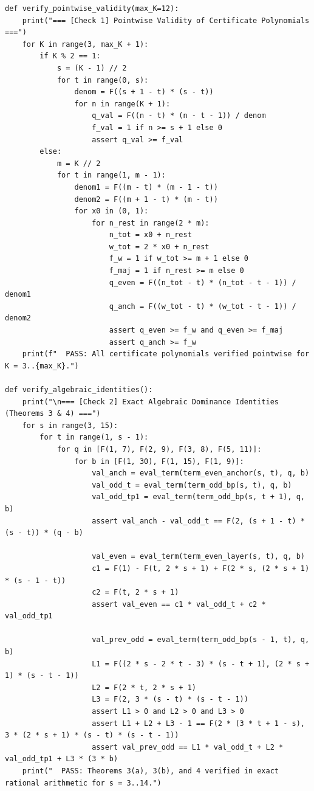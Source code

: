 \documentclass[11pt,a4paper]{article}
\theoremstyle{definition}
\theoremstyle{remark}
\begin{document}
\begin{lstlisting}
def verify_pointwise_validity(max_K=12):
    print("=== [Check 1] Pointwise Validity of Certificate Polynomials ===")
    for K in range(3, max_K + 1):
        if K % 2 == 1:
            s = (K - 1) // 2
            for t in range(0, s):
                denom = F((s + 1 - t) * (s - t))
                for n in range(K + 1):
                    q_val = F((n - t) * (n - t - 1)) / denom
                    f_val = 1 if n >= s + 1 else 0
                    assert q_val >= f_val
        else:
            m = K // 2
            for t in range(1, m - 1):
                denom1 = F((m - t) * (m - 1 - t))
                denom2 = F((m + 1 - t) * (m - t))
                for x0 in (0, 1):
                    for n_rest in range(2 * m):
                        n_tot = x0 + n_rest
                        w_tot = 2 * x0 + n_rest
                        f_w = 1 if w_tot >= m + 1 else 0
                        f_maj = 1 if n_rest >= m else 0
                        q_even = F((n_tot - t) * (n_tot - t - 1)) / denom1
                        q_anch = F((w_tot - t) * (w_tot - t - 1)) / denom2
                        assert q_even >= f_w and q_even >= f_maj
                        assert q_anch >= f_w
    print(f"  PASS: All certificate polynomials verified pointwise for K = 3..{max_K}.")

def verify_algebraic_identities():
    print("\n=== [Check 2] Exact Algebraic Dominance Identities (Theorems 3 & 4) ===")
    for s in range(3, 15):
        for t in range(1, s - 1):
            for q in [F(1, 7), F(2, 9), F(3, 8), F(5, 11)]:
                for b in [F(1, 30), F(1, 15), F(1, 9)]:
                    val_anch = eval_term(term_even_anchor(s, t), q, b)
                    val_odd_t = eval_term(term_odd_bp(s, t), q, b)
                    val_odd_tp1 = eval_term(term_odd_bp(s, t + 1), q, b)
                    assert val_anch - val_odd_t == F(2, (s + 1 - t) * (s - t)) * (q - b)

                    val_even = eval_term(term_even_layer(s, t), q, b)
                    c1 = F(1) - F(t, 2 * s + 1) + F(2 * s, (2 * s + 1) * (s - 1 - t))
                    c2 = F(t, 2 * s + 1)
                    assert val_even == c1 * val_odd_t + c2 * val_odd_tp1

                    val_prev_odd = eval_term(term_odd_bp(s - 1, t), q, b)
                    L1 = F((2 * s - 2 * t - 3) * (s - t + 1), (2 * s + 1) * (s - t - 1))
                    L2 = F(2 * t, 2 * s + 1)
                    L3 = F(2, 3 * (s - t) * (s - t - 1))
                    assert L1 > 0 and L2 > 0 and L3 > 0
                    assert L1 + L2 + L3 - 1 == F(2 * (3 * t + 1 - s), 3 * (2 * s + 1) * (s - t) * (s - t - 1))
                    assert val_prev_odd == L1 * val_odd_t + L2 * val_odd_tp1 + L3 * (3 * b)
    print("  PASS: Theorems 3(a), 3(b), and 4 verified in exact rational arithmetic for s = 3..14.")


\end{lstlisting}
\end{document}

